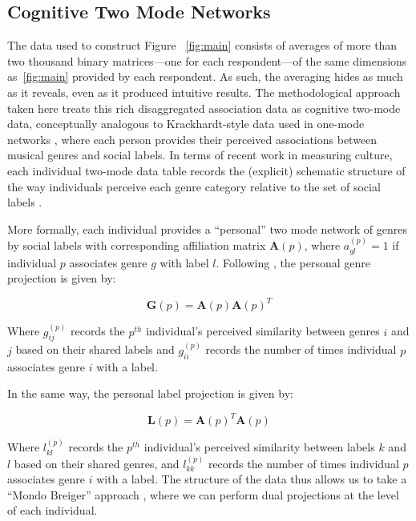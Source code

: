 \documentclass[12pt]{article}
\begin{document}
\subsection*{Cognitive Two Mode Networks}
The data used to construct Figure ~\ref{fig:main} consists of averages of more than two thousand binary matrices---one for each respondent---of the same dimensions as~\ref{fig:main} provided by each respondent. As such, the averaging hides as much as it reveals, even as it produced intuitive results. The methodological approach taken here treats this rich disaggregated association data as cognitive two-mode data, conceptually analogous to Krackhardt-style data used in one-mode networks \citep{batchelder1997consensus-f5c, kumbasar1994systematic-213}, where each person provides their perceived associations between musical genres and social labels. In terms of recent work in measuring culture, each individual two-mode data table records the (explicit) schematic structure of the way individuals perceive each genre category relative to the set of social labels \citep{hunzaker2019mapping-280}.

More formally, each individual provides a ``personal'' two mode network of genres by social labels with corresponding affiliation matrix $\mathbf{A}(p)$, where $a^{(p)}_{gl} = 1$ if individual $p$ associates genre $g$ with label $l$. Following \citet{breiger1974duality-1d0}, the personal genre projection is given by:

\begin{equation}
   \mathbf{G}(p) = \mathbf{A}(p)\mathbf{A}(p)^T 
\end{equation}

Where $g^{(p)}_{ij}$ records the $p^{th}$ individual's perceived similarity between genres $i$ and $j$ based on their shared labels and $g^{(p)}_{ii}$ records the number of times individual $p$ associates genre $i$ with a label.

In the same way, the personal label projection is given by:

\begin{equation}
    \mathbf{L}(p) = \mathbf{A}(p)^T\mathbf{A}(p)
\end{equation}
 
Where $l^{(p)}_{kl}$ records the $p^{th}$ individual's perceived similarity between labels $k$ and $l$ based on their shared genres, and $l^{(p)}_{kk}$ records the number of times individual $p$ associates genre $i$ with a label. The structure of the data thus allows us to take a ``Mondo Breiger'' approach \citep{lee2018doorway-008}, where we can perform dual projections at the level of each individual. 
\end{document}
